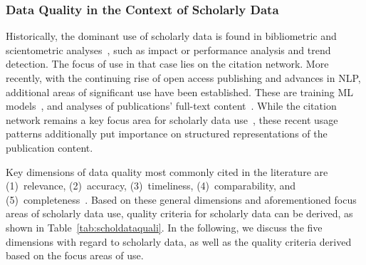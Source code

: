 \subsubsection{Data Quality in the Context of Scholarly Data}

Historically, the dominant use of scholarly data is found in bibliometric and scientometric analyses~\cite{Garfield1964,Mingers2015}, such as impact or performance analysis and trend detection. The focus of use in that case lies on the citation network. %
More recently, with the continuing rise of open access publishing and advances in NLP, additional areas of significant use have been established. These are training ML models~\cite{Gudivada2017}, and analyses of publications' full-text content~\cite{Jurgens2018,Lahav2022}. While the citation network remains a key focus area for scholarly data use~\cite{Wu2022doceng}, these recent usage patterns additionally put importance on structured representations of the publication content.

Key dimensions of data quality most commonly cited in the literature are (1)~relevance, (2)~accuracy, (3)~timeliness, (4)~comparability, and (5)~completeness~\cite{Herzog2007}. Based on these general dimensions and aforementioned focus areas of scholarly data use, quality criteria for scholarly data can be derived, as shown in Table~\ref{tab:scholdataquali}. In the following, we discuss the five dimensions with regard to scholarly data, as well as the quality criteria derived based on the focus areas of use.


